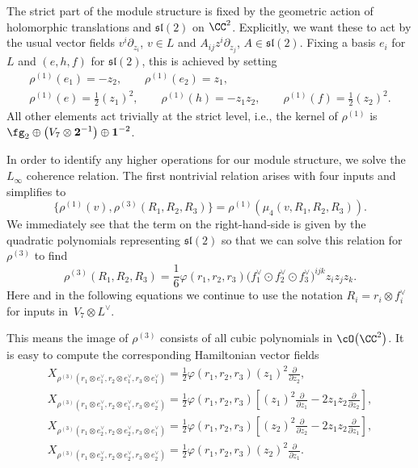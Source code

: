 \documentclass[pdftex]{sigma}
\numberwithin{equation}{section}
\theoremstyle{definition}
\def\lie#1{\ensuremath{\mathfrak{#1}}}
\begin{document}
The strict part of the module structure is fixed by the geometric action of holomorphic translations and $\lie{sl}(2)$ on $\CC^2$. Explicitly, we want these to act by the usual vector fields
$
 v^i \partial_{z_i}$, $v \in L $ and $ A_{ij}z^i \partial_{z_j}$, $ A \in \mathfrak{sl}(2)$.
Fixing a basis $e_i$ for $L$ and $(e,h,f)$ for $\lie{sl}(2)$, this is achieved by setting
\begin{gather}
 \rho^{(1)}(e_1) = -z_2, \qquad \rho^{(1)}(e_2) = z_1, \nonumber\\
 \rho^{(1)}(e) = \frac{1}{2}(z_1)^2, \qquad \rho^{(1)}(h) = -z_1 z_2, \qquad \rho^{(1)}(f) = \frac{1}{2}(z_2)^2. \label{eq: rho1}
\end{gather}
All other elements act trivially at the strict level, i.e., the kernel of $\rho^{(1)}$ is $\fg_2 \oplus \big(V_7 \otimes \textbf{2}^{-1}\big) \oplus \textbf{1}^{-2}$.

In order to identify any higher operations for our module structure, we solve the $L_\infty$ coherence relation. The first nontrivial relation arises with four inputs and simplifies to
\[%
 \big\{ \rho^{(1)}(v) , \rho^{(3)} (R_1,R_2,R_3) \big\} = \rho^{(1)}(\mu_4(v,R_1,R_2,R_3)).
\]
We immediately see that the term on the right-hand-side is given by the quadratic polynomials representing $\mathfrak{sl}(2)$ so that we can solve this relation for $\rho^{(3)}$ to find
\[
 \rho^{(3)}(R_1, R_2, R_3) = \frac{1}{6} \varphi(r_1,r_2,r_3) \big(f_1^\vee \odot f_2^\vee \odot f_3^\vee\big)^{ijk} z_i z_j z_k.
\]
Here and in the following equations we continue to use the notation $R_i=r_i \otimes f_i^\vee$ for inputs in~${V_7 \otimes L^\vee}$.

This means the image of $\rho^{(3)}$ consists of all cubic polynomials in $\cO\big(\CC^2\big)$.
It is easy to compute the corresponding Hamiltonian vector fields
\begin{gather}
 X_{\rho^{(3)}(r_1 \otimes e_1^\vee,r_2 \otimes e_1^\vee,r_3 \otimes e_1^\vee)} = \frac{1}{2} \varphi(r_1,r_2,r_3) (z_1)^2 \frac{\partial}{\partial z_2},\nonumber \\
 X_{\rho^{(3)}(r_1 \otimes e_1^\vee, r_2 \otimes e_1^\vee, r_3 \otimes e_2^\vee)} = \frac{1}{2} \varphi(r_1,r_2,r_3) \left[ (z_1)^2 \frac{\partial}{\partial z_1} - 2z_1 z_2 \frac{\partial}{\partial z_2} \right],\nonumber\\
 X_{\rho^{(3)}(r_1 \otimes e_2^\vee, r_2 \otimes e_2^\vee, r_3 \otimes e_1^\vee)} = \frac{1}{2} \varphi(r_1,r_2,r_3) \left[ (z_2)^2 \frac{\partial}{\partial z_2} -2z_1 z_2 \frac{\partial}{\partial z_1} \right],\nonumber\\
 X_{\rho^{(3)}(r_1 \otimes e_2^\vee,r_2 \otimes e_2^\vee,r_3 \otimes e_2^\vee)} = \frac{1}{2} \varphi(r_1,r_2,r_3) (z_2)^2 \frac{\partial}{\partial z_1}. \label{eq: rho3}
\end{gather}
\end{document}

